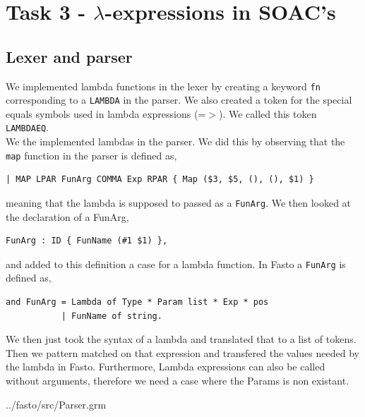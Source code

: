 \documentclass[11pt]{article}
\begin{document}
    \section{Task 3 - $\lambda$-expressions in SOAC's}
    \subsection{Lexer and parser}
    We implemented lambda functions in the lexer by creating a keyword
    \texttt{fn} corresponding to a \texttt{LAMBDA} in the parser.  We also
    created a token for the special equals symbols used in lambda expressions
    (=$>$).  We called this token \texttt{LAMBDAEQ}.\\
    We the implemented lambdas
    in the parser.  We did this by observing that the \texttt{map} function in
    the parser is defined as,

    \begin{lstlisting}[basicstyle=\small]
| MAP LPAR FunArg COMMA Exp RPAR { Map ($3, $5, (), (), $1) }
    \end{lstlisting}

    meaning that the lambda is supposed to passed as a \texttt{FunArg}.  We then
    looked at the declaration of a FunArg,

    \begin{lstlisting}[basicstyle=\small]
FunArg : ID { FunName (#1 $1) },
    \end{lstlisting}

    and added to this definition a case for a lambda function.  In Fasto a
    \texttt{FunArg} is defined as,

    \begin{lstlisting}[basicstyle=\small]
and FunArg = Lambda of Type * Param list * Exp * pos
           | FunName of string.
    \end{lstlisting}

    We then just took the syntax of a lambda and translated that to a list of
    tokens.  Then we pattern matched on that expression and transfered the
    values needed by the lambda in Fasto. Furthermore, Lambda expressions can also
    be called without arguments, therefore we need a case where the Params is non
    existant.


{../fasto/src/Parser.grm}
\end{document}
